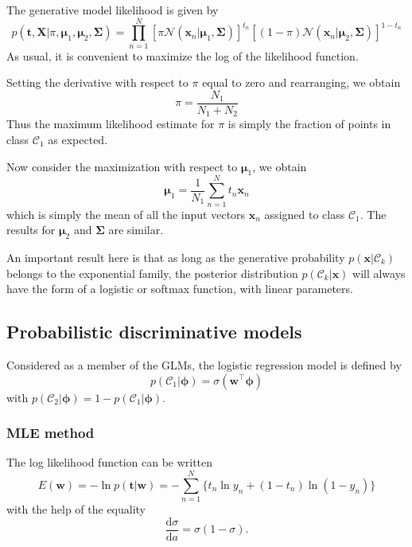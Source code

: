 \documentclass[a4paper]{book}
\newcommand{\ud}{\mathrm{d}}
\renewcommand{\bf}{\mathbf}
\renewcommand{\cal}{\mathcal}
\newcommand{\bs}{\boldsymbol}
\begin{document}
The generative model likelihood is given by
\begin{equation}
	p(\bf{t,X}|\pi,\bs{\mu}_1,\bs{\mu}_2,\bs{\Sigma}) = \prod_{n=1}^N [\pi \cal{N}(\bf{x}_n|\bs{\mu}_1,\bs{\Sigma})]^{t_n}[(1-\pi)\cal{N}(\bf{x}_n|\bs{\mu}_2,\bs{\Sigma})]^{1-t_n}
\end{equation}
As usual, it is convenient to maximize the log of the likelihood function.

Setting the derivative with respect to $\pi$ equal to zero and rearranging, we obtain
\begin{equation}
	\pi = \frac{N_1}{N_1+N_2}
\end{equation}
Thus the maximum likelihood estimate for $\pi$ is simply the fraction of points in class $\cal{C}_1$ as expected.

Now consider the maximization with respect to $\bs{\mu}_1$, we obtain
\begin{equation}
	\bs{\mu}_1 = \frac{1}{N_1} \sum_{n=1}^N t_n \bf{x}_n
\end{equation}
which is simply the mean of all the input vectors $\bf{x}_n$ assigned to class $\cal{C}_1$. The results for $\bs{\mu}_2$ and $\bs{\Sigma}$ are similar. 

An important result here is that as long as the generative probability $p(\bf{x}|\cal{C}_k)$ belongs to the exponential family, the posterior distribution $p(\cal{C}_k|\bf{x})$ will always have the form of a logistic or softmax function, with linear parameters.
\subsection{Probabilistic discriminative models} \label{LC}
Considered as a member of the GLMs, the logistic regression model is defined by
\begin{equation}
	p(\cal{C}_1|\bs{\phi}) = \sigma(\bf{w}^{\intercal} \bs{\phi})
\end{equation}
with $p(\cal{C}_2|\bs{\phi}) = 1-p(\cal{C}_1|\bs{\phi})$.

\subsubsection{MLE method}
The log likelihood function can be written
\begin{equation}
	E(\bf{w}) = -\ln p(\bf{t|w}) = -\sum_{n=1}^N \{ t_n \ln y_n + (1-t_n) \ln (1-y_n) \}
\end{equation}
with the help of the equality
\begin{equation}
	\frac{\ud \sigma}{\ud a} = \sigma (1-\sigma).
\end{equation}
\end{document}
